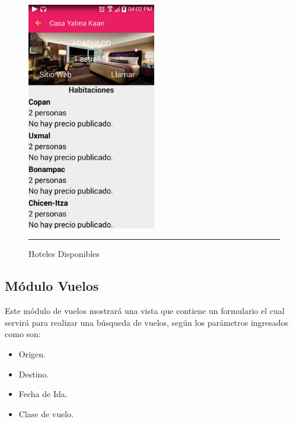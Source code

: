 \begin{figure}[h]
	\centering
		\includegraphics[width=0.5\textwidth]{Figuras/detalle.png}
		\rule{30em}{0.5pt}
	\caption[Hoteles Disponibles]{Hoteles Disponibles}
	\label{fig:hotelesDisponibles}
\end{figure}

\clearpage

\subsection{Módulo Vuelos}
Este módulo de vuelos mostrará una vista que contiene un formulario el cual servirá para realizar una búsqueda de vuelos, según los parámetros ingresados como son:

\begin{itemize}
\item Origen.
\item Destino.
\item Fecha de Ida.
\item Clase de vuelo.
\end{itemize}

